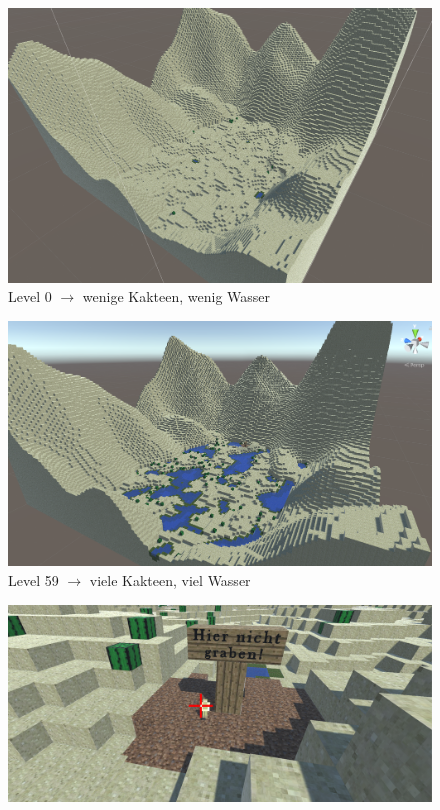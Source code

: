 \documentclass{article}
\begin{document}
\begin{center}
\begin{figure}
\includegraphics[width=\textwidth]{level0_1.png}
\caption{Level 0 $\rightarrow$ wenige Kakteen, wenig Wasser}
\end{figure}
\begin{figure}
\includegraphics[width=\textwidth]{level59_1.png}
\caption{Level 59 $\rightarrow$ viele Kakteen, viel Wasser}
\end{figure}
\begin{figure}
\includegraphics[width=\textwidth]{sign_1.png}

\end{figure}
\end{center}
\end{document}
